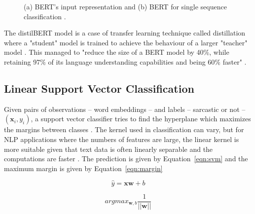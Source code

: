 \begin{figure}[!h]
	\centering
	\hfill
	\caption{(a) BERT's input representation and (b) BERT for single sequence classification \citep{devlin2019bert}.}
\end{figure}



The distilBERT model is a case of transfer learning technique called distillation where a "student" model is trained to achieve  the behaviour of a larger "teacher" model \citep{sanh2020distilbert}. This managed to "reduce the size of a BERT model by 40\%, while retaining 97\% of its language understanding capabilities and being 60\% faster" \citep{sanh2020distilbert}.



\subsection{Linear Support Vector Classification}

Given pairs of observations -- word embeddings -- and labels -- sarcastic or not -- $(\mathbf{x}_i, y_i)$, a support vector classifier tries to find the hyperplane which maximizes the margins between classes \citep{pena2019}. The kernel used in classification can vary, but for NLP applications where the numbers of features are large, the linear kernel is more suitable given that text data is often linearly separable and the computations are faster \citep{hsu2003}. The prediction is given by Equation~\ref{eqn:svm} and  the maximum margin is given by Equation~\ref{eqn:margin} \citep{pena2019} 

\begin{equation}
	\label{eqn:svm}
 	\hat{y}= \mathbf{xw} +  b
\end{equation}

\begin{equation}
	\label{eqn:margin}
	argmax_{\mathbf{w}, b} \frac{1}{||\mathbf{w}||}
\end{equation}

